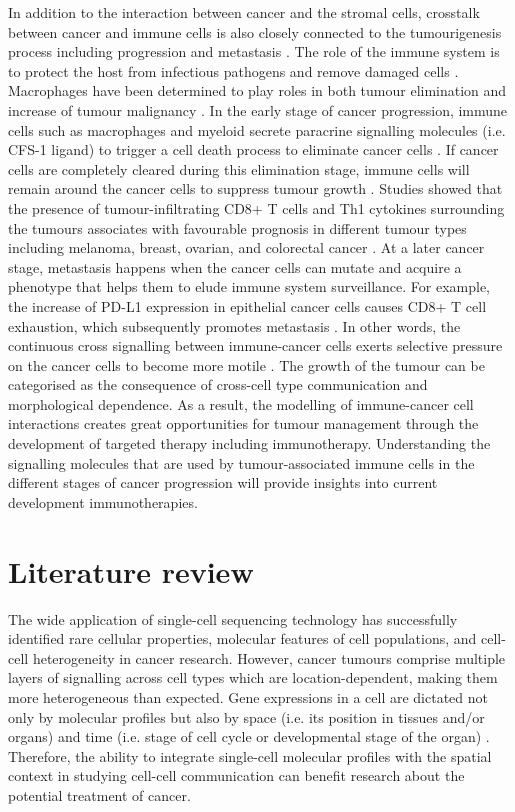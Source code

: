 In addition to the interaction between cancer and the stromal cells, crosstalk between cancer and immune cells is also closely connected to the tumourigenesis process including progression and metastasis \cite{wang2017role}. The role of the immune system is to protect the host from infectious pathogens and remove damaged cells \cite{davis2007molecular}. Macrophages have been determined to play roles in both tumour elimination and increase of tumour malignancy \cite{wyckoff2007direct, chung2005molecular}. In the early stage of cancer progression, immune cells such as macrophages and myeloid secrete paracrine signalling molecules (i.e. CFS-1 ligand)  to trigger a cell death process to eliminate cancer cells \cite{wyckoff2007direct}. If cancer cells are completely cleared during this elimination stage, immune cells will remain around the cancer cells to suppress tumour growth \cite{bronkhorst2011detection, ly2010aged}. Studies showed that the presence of tumour-infiltrating CD8+ T cells and Th1 cytokines surrounding the tumours associates with favourable prognosis in different tumour types including melanoma, breast, ovarian, and colorectal cancer \cite{fridman2012immune, shalapour2015immunity}. At a later cancer stage, metastasis happens when the cancer cells can mutate and acquire a phenotype that helps them to elude immune system surveillance. For example, the increase of PD-L1 expression in epithelial cancer cells causes CD8+ T cell exhaustion, which subsequently promotes metastasis \cite{chen2014metastasis, wei2019combination}. In other words, the continuous cross signalling between immune-cancer cells exerts selective pressure on the cancer cells to become more motile \cite{giampieri2009localized,ilina2009mechanisms}. The growth of the tumour can be categorised as the consequence of cross-cell type communication and morphological dependence. As a result, the modelling of immune-cancer cell interactions creates great opportunities for tumour management through the development of targeted therapy including immunotherapy. Understanding the signalling molecules that are used by tumour-associated immune cells in the different stages of cancer progression will provide insights into current development immunotherapies.  

\section{Literature review}
\label{section:lit_review}
The wide application of single-cell sequencing technology has successfully identified rare cellular properties, molecular features of cell populations, and cell-cell heterogeneity in cancer research. However, cancer tumours comprise multiple layers of signalling across cell types which are location-dependent, making them more heterogeneous than expected. Gene expressions in a cell are dictated not only by molecular profiles but also by space (i.e. its position in tissues and/or organs) and time (i.e. stage of cell cycle or developmental stage of the organ) \cite{salomon2020genomic}. Therefore, the ability to integrate single-cell molecular profiles with the spatial context in studying cell-cell communication can benefit research about the potential treatment of cancer.

